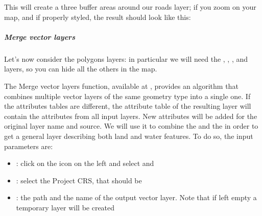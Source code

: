 \documentclass[letterpaper,10pt,english]{sphinxmanual}
\begin{document}
This will create a three buffer areas around our roads layer; if you zoom on your map, and if properly styled, the result should look like this:

\noindent{}


\subparagraph{Merge vector layers}
\label{\detokenize{vector/merge:merge-vector-layers}}\label{\detokenize{vector/merge::doc}}
Let’s now consider the polygons layers: in particular we will need the , , , 
and  layers, so you can hide all the others in the map.

\begin{figure}[htbp]
\centering

\noindent{}
\end{figure}

The Merge vector layers function, available at , provides an algorithm that
combines multiple vector layers of the same geometry type into a single one. If the attributes tables are different, the attribute
table of the resulting layer will contain the attributes from all input layers. New attributes will be added for the original layer
name and source. We will use it to combine the  and the  in order to get a general layer describing both
land and water features. To do so, the input parameters are:
\begin{itemize}
\item {} 
: click on the icon on the left and select  and 

\item {} 
: select the Project CRS, that should be 

\item {} 
: the path and the name of the output vector layer. Note that if left empty a temporary layer will be created

\end{itemize}
\end{document}
